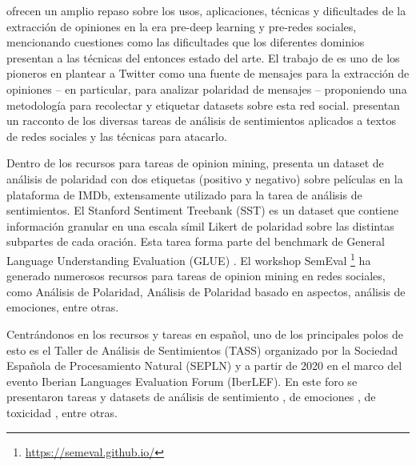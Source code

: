 \citet{pang2008opinion} ofrecen un amplio repaso sobre los usos, aplicaciones, técnicas y dificultades de la extracción de opiniones en la era pre-deep learning y pre-redes sociales, mencionando cuestiones como las dificultades que los diferentes dominios presentan a las técnicas del entonces estado del arte. El trabajo de \citet{pak2010twitter} es uno de los pioneros en plantear a Twitter como una fuente de mensajes para la extracción de opiniones -- en particular, para analizar polaridad de mensajes -- proponiendo una metodología para recolectar y etiquetar datasets sobre esta red social. \citet{yue2019survey} presentan un racconto de los diversas tareas de análisis de sentimientos aplicados a textos de redes sociales y las técnicas para atacarlo.

Dentro de los recursos para tareas de opinion mining, \citet{maas-EtAl:2011:ACL-HLT2011} presenta un dataset de análisis de polaridad con dos etiquetas (positivo y negativo) sobre películas en la plataforma de IMDb, extensamente utilizado para la tarea de análisis de sentimientos. El Stanford Sentiment Treebank (SST) \cite{socher-etal-2013-recursive} es un dataset que contiene información granular en una escala símil Likert de polaridad sobre las distintas subpartes de cada oración. Esta tarea forma parte del benchmark de General Language Understanding Evaluation (GLUE) \cite{wang-etal-2018-glue}. El workshop SemEval \footnote{\url{https://semeval.github.io/}} ha generado numerosos recursos para tareas de opinion mining en redes sociales, como Análisis de Polaridad, Análisis de Polaridad basado en aspectos, análisis de emociones, entre otras.

Centrándonos en los recursos y tareas en español, uno de los principales polos de esto es el Taller de Análisis de Sentimientos (TASS) \cite{overview_tass2018,garcia2020overview,cumbreras2016overview} organizado por la Sociedad Española de Procesamiento Natural (SEPLN) y a partir de 2020 en el marco del evento Iberian Languages Evaluation Forum (IberLEF). En este foro se presentaron tareas y datasets de análisis de sentimiento \cite{garcia2020overview}, de emociones \cite{plaza-del-arco-etal-2020-emoevent}, de toxicidad \cite{taule2021detoxis}, entre otras.


